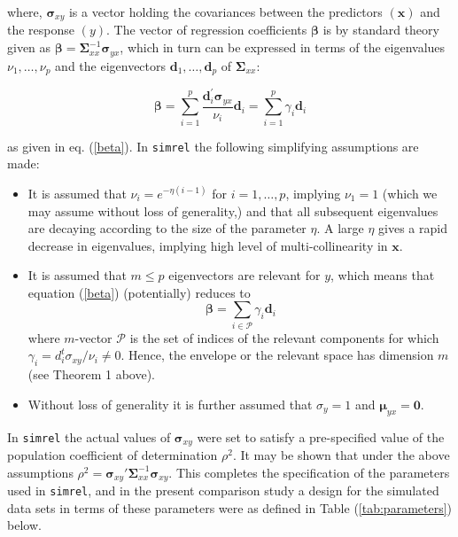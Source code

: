 \documentclass[a4paper, 11pt]{article}
\begin{document}
where, $\boldsymbol{\sigma}_{xy}$ is a vector holding the covariances between the predictors $(\mathbf{x})$ and the response $(y)$. The vector of regression coefficients  $\boldsymbol{\beta}$ is by standard theory given as $\boldsymbol{\beta} = \boldsymbol{\Sigma}_{xx}^{-1}\boldsymbol{\sigma}_{yx}$, which in turn can be expressed in terms of the eigenvalues $\nu_1, \ldots, \nu_p$ and the eigenvectors $\bm{d}_1, \ldots, \bm{d}_p$ of $\boldsymbol{\Sigma}_{xx}$:

\begin{equation}
\boldsymbol{\beta} = \sum_{i=1}^p \frac{\boldsymbol{d}_i^{'}\boldsymbol{\sigma}_{yx}}{\nu_i}\boldsymbol{d}_i = \sum_{i=1}^p\gamma_i \boldsymbol{d}_i
\end{equation} 

as given in eq. (\ref{beta}). In {\tt simrel} the following simplifying assumptions are made: 

\begin{itemize}[label=$\triangleright$]
\item It is assumed that $\nu_{i} = e^{-\eta(i-1)}$ for $i=1, \ldots, p$, implying $\nu_1=1$ (which we may assume without loss of generality,) and that all subsequent eigenvalues are decaying according to the size of the parameter $\eta$.  A large $\eta$ gives a rapid decrease in eigenvalues, implying high level of multi-collinearity in $\boldsymbol{x}$.
\item It is assumed that $m \le p$ eigenvectors are relevant for $y$, which means that equation (\ref{beta}) (potentially) reduces to
 \begin{equation}
   \label{eq:relevant-beta}
   \bm{\beta} = \sum_{i \in \mathcal{P}}{\gamma_i \bm{d}_i}
 \end{equation}
 where $m$-vector $\mathcal{P}$ is the set of indices of the relevant components for which $\gamma_i = d_i^t \sigma_{xy}/\nu_i \ne 0$. Hence, the envelope or the relevant space has dimension $m$ (see Theorem 1 above).
\item Without loss of generality it is further assumed that $\sigma_y=1$ and $\boldsymbol{\mu}_{yx}=\boldsymbol{0}$.
\end{itemize}

In {\tt simrel} the actual values of $\boldsymbol{\sigma}_{xy}$ were set to satisfy a pre-specified value of the population coefficient of determination $\rho^2$. It may be shown that under the above assumptions $\rho^2=\boldsymbol{\sigma}_{xy}'\boldsymbol{\Sigma}_{xx}^{-1}\boldsymbol{\sigma}_{xy}$. This completes the specification of the parameters used in {\tt simrel}, and in the present comparison study a design for the simulated data sets in terms of these parameters were as defined in Table (\ref{tab:parameters}) below.
\end{document}
